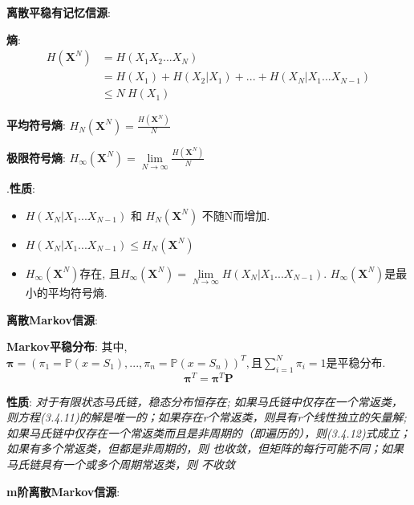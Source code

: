 \documentclass{article}
\begin{document}
            \textbf{离散平稳有记忆信源}:
                
                \qquad \textbf{熵}:
                    \begin{align*}
                        H(\boldsymbol X^N) 
                        &= H(X_1 X_2 ... X_N) \tag{定义}\\
                        &= H(X_1) + H(X_2|X_1) + ... + H(X_N | X_1 ... X_{N-1}) \tag{条件熵展开}\\
                        &\le N\ H(X_1) \tag{熵的不增原理}
                    \end{align*}
                    
                \qquad \textbf{平均符号熵}: $H_N(\boldsymbol X^N) = \frac{H(\boldsymbol X^N)}{N}$
                
                \qquad \textbf{极限符号熵}: $H_\infty(\boldsymbol X^N) = \lim\limits_{N \to \infty} \frac{H(\boldsymbol X^N)}{N}$
                
                    \qquad.\qquad \textbf{性质}: 
                        \begin{itemize}
                        \item $H(X_N | X_1 ... X_{N-1})$ 和 $H_N(\boldsymbol X^N)$ 不随N而增加.
                        \item $H(X_N | X_1 ... X_{N-1}) \le H_N(\boldsymbol X^N)$
                        \item $H_\infty(\boldsymbol X^N)$存在, 且$H_\infty(\boldsymbol X^N) = \lim\limits_{N \to \infty} H(X_N | X_1 ... X_{N-1})$. $H_\infty(\boldsymbol X^N)$是最小的平均符号熵.
                        \end{itemize}
                

        \textbf{离散Markov信源}:
        
            \textbf{Markov平稳分布}: 其中, $\boldsymbol \pi = (\pi_1 = \mathbb P(x = S_1), ..., \pi_n = \mathbb P(x = S_n))^T, \text{且} \sum\limits_{i=1}^N \pi_i = 1$是平稳分布.
                $$\boldsymbol \pi^T = \boldsymbol \pi^T \boldsymbol P$$
                
                \textbf{性质}: \textit{对于有限状态马氏链，稳态分布恒存在; 如果马氏链中仅存在一个常返类，则方程(3.4.11)的解是唯一的；如果存在r个常返类，则具有r个线性独立的矢量解; 如果马氏链中仅存在一个常返类而且是非周期的（即遍历的），则(3.4.12)式成立；如果有多个常返类，但都是非周期的，则       也收敛，但矩阵的每行可能不同；如果马氏链具有一个或多个周期常返类，则      不收敛}

        \textbf{m阶离散Markov信源}:
        
\end{document}
